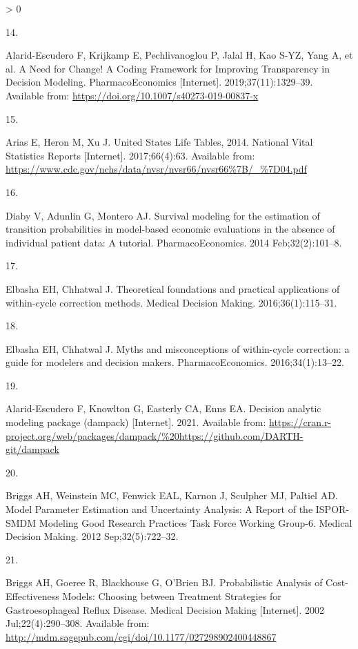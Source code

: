 \documentclass[
]{article}
\newlength{\cslhangindent}
\newlength{\csllabelwidth}
\newenvironment{CSLReferences}[2] %
 {%
  \setlength{\parindent}{0pt}
  \ifodd #1 \everypar{\setlength{\hangindent}{\cslhangindent}}\ignorespaces\fi
  \ifnum #2 > 0
  \setlength{\parskip}{#2\baselineskip}
  \fi
 }%
 {}
\newcommand{\CSLLeftMargin}[1]{\parbox[t]{\csllabelwidth}{#1}}
\newcommand{\CSLRightInline}[1]{\parbox[t]{\linewidth - \csllabelwidth}{#1}\break}
\begin{document}
\begin{CSLReferences}{0}{0}
\leavevmode\hypertarget{ref-Alarid-Escudero2019e}{}%
\CSLLeftMargin{14. }
\CSLRightInline{Alarid-Escudero F, Krijkamp E, Pechlivanoglou P, Jalal H, Kao S-YZ, Yang A, et al. {A Need for Change! A Coding Framework for Improving Transparency in Decision Modeling}. PharmacoEconomics {[}Internet{]}. 2019;37(11):1329--39. Available from: \url{https://doi.org/10.1007/s40273-019-00837-x}}

\leavevmode\hypertarget{ref-Arias2017}{}%
\CSLLeftMargin{15. }
\CSLRightInline{Arias E, Heron M, Xu J. {United States Life Tables, 2014}. National Vital Statistics Reports {[}Internet{]}. 2017;66(4):63. Available from: \url{https://www.cdc.gov/nchs/data/nvsr/nvsr66/nvsr66\%7B/_\%7D04.pdf}}

\leavevmode\hypertarget{ref-Diaby2014}{}%
\CSLLeftMargin{16. }
\CSLRightInline{Diaby V, Adunlin G, Montero AJ. {Survival modeling for the estimation of transition probabilities in model-based economic evaluations in the absence of individual patient data: A tutorial}. PharmacoEconomics. 2014 Feb;32(2):101--8. }

\leavevmode\hypertarget{ref-Elbasha2016}{}%
\CSLLeftMargin{17. }
\CSLRightInline{Elbasha EH, Chhatwal J. {Theoretical foundations and practical applications of within-cycle correction methods}. Medical Decision Making. 2016;36(1):115--31. }

\leavevmode\hypertarget{ref-Elbasha2016a}{}%
\CSLLeftMargin{18. }
\CSLRightInline{Elbasha EH, Chhatwal J. {Myths and misconceptions of within-cycle correction: a guide for modelers and decision makers}. PharmacoEconomics. 2016;34(1):13--22. }

\leavevmode\hypertarget{ref-Alarid-Escudero2021}{}%
\CSLLeftMargin{19. }
\CSLRightInline{Alarid-Escudero F, Knowlton G, Easterly CA, Enns EA. Decision analytic modeling package (dampack) {[}Internet{]}. 2021. Available from: \url{https://cran.r-project.org/web/packages/dampack/\%20https://github.com/DARTH-git/dampack}}

\leavevmode\hypertarget{ref-Briggs2012}{}%
\CSLLeftMargin{20. }
\CSLRightInline{Briggs AH, Weinstein MC, Fenwick EAL, Karnon J, Sculpher MJ, Paltiel AD. {Model Parameter Estimation and Uncertainty Analysis: A Report of the ISPOR-SMDM Modeling Good Research Practices Task Force Working Group-6.} Medical Decision Making. 2012 Sep;32(5):722--32. }

\leavevmode\hypertarget{ref-Briggs2002}{}%
\CSLLeftMargin{21. }
\CSLRightInline{Briggs AH, Goeree R, Blackhouse G, O'Brien BJ. {Probabilistic Analysis of Cost-Effectiveness Models: Choosing between Treatment Strategies for Gastroesophageal Reflux Disease}. Medical Decision Making {[}Internet{]}. 2002 Jul;22(4):290--308. Available from: \url{http://mdm.sagepub.com/cgi/doi/10.1177/027298902400448867}}


\end{CSLReferences}
\end{document}
